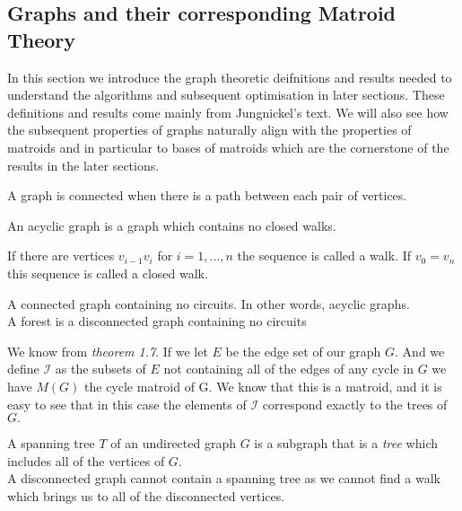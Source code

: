 \documentclass[../main.tex]{subfiles}
\begin{document}
\subsection{Graphs and their corresponding Matroid Theory}
In this section we introduce the graph theoretic deifnitions and results needed to understand the algorithms and subsequent optimisation in later sections. These definitions and results come mainly from Jungnickel's\cite{jungnickel} text. We will also see how the subsequent properties of graphs naturally align with the properties of matroids and in particular to bases of matroids which are the cornerstone of the results in the later sections.

\begin{defn}[Connected]
A graph is connected when there is a path between each pair of vertices.
\end{defn}
 
\begin{defn}[Acyclic]
An acyclic graph is a graph which contains no closed walks.
\end{defn}

\begin{defn}[Walk]
If there are vertices $v_{i-1}v_i$ for $i = 1, ..., n$ the sequence is called a walk. If $v_0 = v_n$ this sequence is called a closed walk.
\end{defn} 

\begin{defn}[Tree]
A connected graph containing no circuits. In other words, acyclic graphs.\\
\noindent A forest is a disconnected graph containing no circuits\\
\end{defn}

\noindent We know from \textit{theorem 1.7}. If we let $E$ be the edge set of our graph $G.$ And we define $\mathcal{I}$ as the subsets of $E$ not containing all of the edges of any cycle in $G$ we have $M(G)$ the cycle matroid of G. We know that this is a matroid, and it is easy to see that in this case the elements of $\mathcal{I}$ correspond exactly to the trees of $G.$

 
\begin{defn}
A spanning tree $T$ of an undirected graph $G$ is a subgraph that is a \textit{tree} which includes all of the vertices of $G.$\\
\noindent A disconnected graph cannot contain a spanning tree as we cannot find a walk which brings us to all of the disconnected vertices.
\end{defn}
\end{document}
